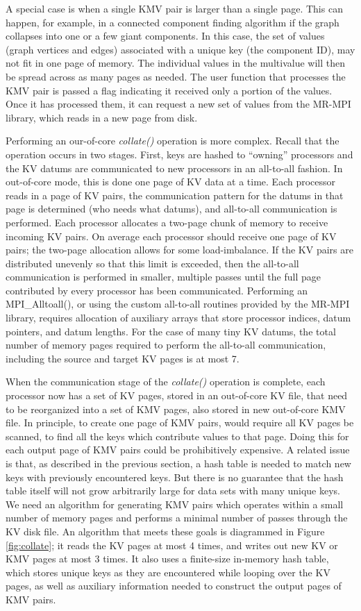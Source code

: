 A special case is when a single KMV pair is larger than a single page.
This can happen, for example, in a connected component finding
algorithm if the graph collapses into one or a few giant components.
In this case, the set of values (graph vertices and edges) associated
with a unique key (the component ID), may not fit in one page of
memory.  The individual values in the multivalue will then be spread
across as many pages as needed.  The user function that processes the
KMV pair is passed a flag indicating it received only a portion of the
values.  Once it has processed them, it can request a new set of
values from the MR-MPI library, which reads in a new page from disk.

Performing an our-of-core {\it collate()} operation is more complex.
Recall that the operation occurs in two stages.  First, keys are
hashed to ``owning'' processors and the KV datums are communicated to
new processors in an all-to-all fashion.  In out-of-core mode, this is
done one page of KV data at a time.  Each processor reads in a page of
KV pairs, the communication pattern for the datums in that page is
determined (who needs what datums), and all-to-all communication is
performed.  Each processor allocates a two-page chunk of memory to
receive incoming KV pairs.  On average each processor should receive
one page of KV pairs; the two-page allocation allows for some
load-imbalance.  If the KV pairs are distributed unevenly so that this
limit is exceeded, then the all-to-all communication is performed in
smaller, multiple passes until the full page contributed by every
processor has been communicated.  Performing an MPI\_Alltoall(), or
using the custom all-to-all routines provided by the MR-MPI library,
requires allocation of auxiliary arrays that store processor indices,
datum pointers, and datum lengths.  For the case of many tiny KV
datums, the total number of memory pages required to perform the
all-to-all communication, including the source and target KV pages is
at most 7.

When the communication stage of the {\it collate()} operation is
complete, each processor now has a set of KV pages, stored in an
out-of-core KV file, that need to be reorganized into a set of KMV
pages, also stored in new out-of-core KMV file.  In principle, to
create one page of KMV pairs, would require all KV pages be scanned,
to find all the keys which contribute values to that page.  Doing this
for each output page of KMV pairs could be prohibitively expensive.  A
related issue is that, as described in the previous section, a hash
table is needed to match new keys with previously encountered keys.
But there is no guarantee that the hash table itself will not grow
arbitrarily large for data sets with many unique keys.  We need an
algorithm for generating KMV pairs which operates within a small
number of memory pages and performs a minimal number of passes through
the KV disk file.  An algorithm that meets these goals is diagrammed
in Figure \ref{fig:collate}; it reads the KV pages at most 4 times, and
writes out new KV or KMV pages at most 3 times.  It also uses a
finite-size in-memory hash table, which stores unique keys as they are
encountered while looping over the KV pages, as well as auxiliary
information needed to construct the output pages of KMV pairs.

